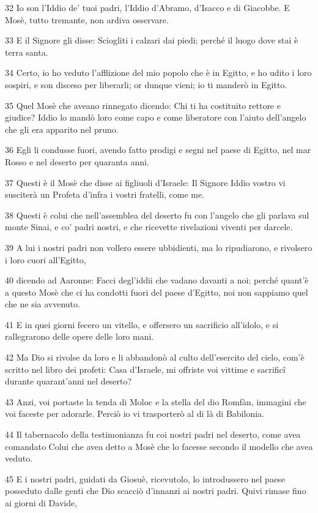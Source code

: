 \par 32 Io son l'Iddio de' tuoi padri, l'Iddio d'Abramo, d'Isacco e di Giacobbe. E Mosè, tutto tremante, non ardiva osservare.
\par 33 E il Signore gli disse: Sciogliti i calzari dai piedi; perché il luogo dove stai è terra santa.
\par 34 Certo, io ho veduto l'afflizione del mio popolo che è in Egitto, e ho udito i loro sospiri, e son disceso per liberarli; or dunque vieni; io ti manderò in Egitto.
\par 35 Quel Mosè che aveano rinnegato dicendo: Chi ti ha costituito rettore e giudice? Iddio lo mandò loro come capo e come liberatore con l'aiuto dell'angelo che gli era apparito nel pruno.
\par 36 Egli li condusse fuori, avendo fatto prodigi e segni nel paese di Egitto, nel mar Rosso e nel deserto per quaranta anni.
\par 37 Questi è il Mosè che disse ai figliuoli d'Israele: Il Signore Iddio vostro vi susciterà un Profeta d'infra i vostri fratelli, come me.
\par 38 Questi è colui che nell'assemblea del deserto fu con l'angelo che gli parlava sul monte Sinai, e co' padri nostri, e che ricevette rivelazioni viventi per darcele.
\par 39 A lui i nostri padri non vollero essere ubbidienti, ma lo ripudiarono, e rivolsero i loro cuori all'Egitto,
\par 40 dicendo ad Aaronne: Facci degl'iddii che vadano davanti a noi; perché quant'è a questo Mosè che ci ha condotti fuori del paese d'Egitto, noi non sappiamo quel che ne sia avvenuto.
\par 41 E in quei giorni fecero un vitello, e offersero un sacrificio all'idolo, e si rallegrarono delle opere delle loro mani.
\par 42 Ma Dio si rivolse da loro e li abbandonò al culto dell'esercito del cielo, com'è scritto nel libro dei profeti: Casa d'Israele, mi offriste voi vittime e sacrificî durante quarant'anni nel deserto?
\par 43 Anzi, voi portaste la tenda di Moloc e la stella del dio Romfàn, immagini che voi faceste per adorarle. Perciò io vi trasporterò al di là di Babilonia.
\par 44 Il tabernacolo della testimonianza fu coi nostri padri nel deserto, come avea comandato Colui che avea detto a Mosè che lo facesse secondo il modello che avea veduto.
\par 45 E i nostri padri, guidati da Giosuè, ricevutolo, lo introdussero nel paese posseduto dalle genti che Dio scacciò d'innanzi ai nostri padri. Quivi rimase fino ai giorni di Davide,
